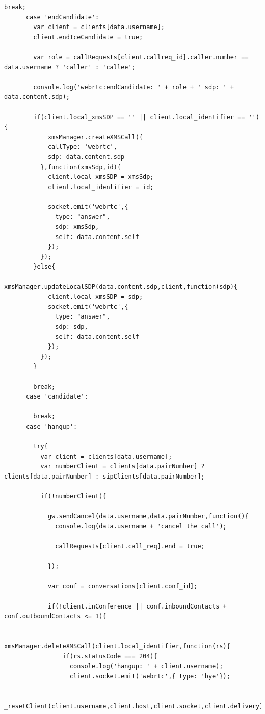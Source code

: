 \begin{appendices}
\begin{lstlisting}[caption={socket.js on Application Server},label={code:server_socket}]
        break;
      case 'endCandidate':
        var client = clients[data.username];
        client.endIceCandidate = true;
        
        var role = callRequests[client.callreq_id].caller.number == data.username ? 'caller' : 'callee';

        console.log('webrtc:endCandidate: ' + role + ' sdp: ' + data.content.sdp);

        if(client.local_xmsSDP == '' || client.local_identifier == ''){
            xmsManager.createXMSCall({
            callType: 'webrtc',
            sdp: data.content.sdp
          },function(xmsSdp,id){
            client.local_xmsSDP = xmsSdp;
            client.local_identifier = id;

            socket.emit('webrtc',{
              type: "answer",
              sdp: xmsSdp,
              self: data.content.self
            });
          });
        }else{
          xmsManager.updateLocalSDP(data.content.sdp,client,function(sdp){
            client.local_xmsSDP = sdp;
            socket.emit('webrtc',{
              type: "answer",
              sdp: sdp,
              self: data.content.self
            });
          });
        }

        break;
      case 'candidate':
        
        break;
      case 'hangup':
        
        try{
          var client = clients[data.username];
          var numberClient = clients[data.pairNumber] ? clients[data.pairNumber] : sipClients[data.pairNumber];

          if(!numberClient){

            gw.sendCancel(data.username,data.pairNumber,function(){
              console.log(data.username + 'cancel the call');

              callRequests[client.call_req].end = true;

            });

            var conf = conversations[client.conf_id];

            if(!client.inConference || conf.inboundContacts + conf.outboundContacts <= 1){

              xmsManager.deleteXMSCall(client.local_identifier,function(rs){
                if(rs.statusCode === 204){
                  console.log('hangup: ' + client.username);
                  client.socket.emit('webrtc',{ type: 'bye'});
                  
                  _resetClient(client.username,client.host,client.socket,client.delivery);
                  

\end{lstlisting}
\end{appendices}
